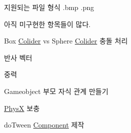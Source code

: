 
\begin{DoxyRefList}
\item[Member \mbox{\hyperlink{class_graphic_core_a2f09f46509760c465a6947f6770b179a}{Graphic\+Core::Load\+Texture}} (std\+::string)]\label{todo__todo000001}%
%
지원되는 파일 형식 .bmp .png  
\item[Class \mbox{\hyperlink{class_rigidbody}{Rigidbody}} ]\label{todo__todo000003}%
%
아직 미구현한 항목들이 많다.
\begin{DoxyItemize}
\item Box \mbox{\hyperlink{class_colider}{Colider}} vs Sphere \mbox{\hyperlink{class_colider}{Colider}} 충돌 처리
\item 반사 벡터
\item 중력  
\end{DoxyItemize}
\item[page \mbox{\hyperlink{index}{Yanity Document Page}} ]\label{todo__todo000002}%
%

\begin{DoxyItemize}
\item Gameobject 부모 자식 관계 만들기
\item \mbox{\hyperlink{class_phys_x}{PhysX}} 보충
\item do\+Tween \mbox{\hyperlink{class_component}{Component}} 제작 
\end{DoxyItemize}
\end{DoxyRefList}